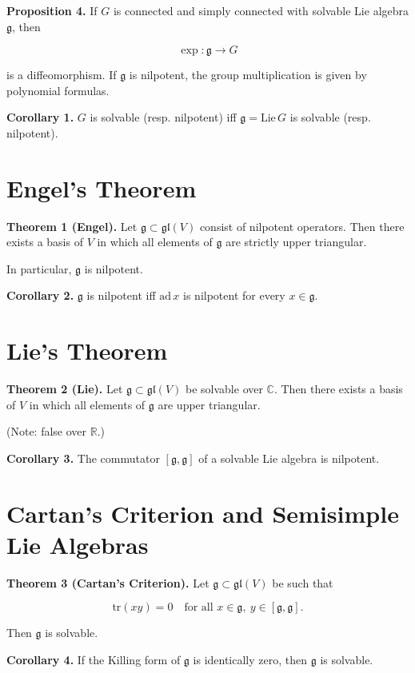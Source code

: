 \textbf{Proposition 4.}
If $G$ is connected and simply connected with solvable Lie algebra
$\mathfrak g$, then

\[
\exp:\mathfrak g\to G
\]

is a diffeomorphism.
If $\mathfrak g$ is nilpotent, the group multiplication
is given by polynomial formulas.

\textbf{Corollary 1.}
$G$ is solvable (resp. nilpotent)
iff $\mathfrak g=\mathrm{Lie}\,G$ is solvable (resp. nilpotent).

\section*{Engel's Theorem}

\textbf{Theorem 1 (Engel).}
Let $\mathfrak g\subset\mathfrak{gl}(V)$ consist of nilpotent operators.
Then there exists a basis of $V$ in which all elements of $\mathfrak g$
are strictly upper triangular.

In particular, $\mathfrak g$ is nilpotent.

\textbf{Corollary 2.}
$\mathfrak g$ is nilpotent iff $\mathrm{ad}\,x$ is nilpotent
for every $x\in\mathfrak g$.

\section*{Lie's Theorem}

\textbf{Theorem 2 (Lie).}
Let $\mathfrak g\subset\mathfrak{gl}(V)$ be solvable over $\mathbb C$.
Then there exists a basis of $V$ in which all elements
of $\mathfrak g$ are upper triangular.

(Note: false over $\mathbb R$.)

\textbf{Corollary 3.}
The commutator $[\mathfrak g,\mathfrak g]$
of a solvable Lie algebra is nilpotent.

\section*{Cartan's Criterion and Semisimple Lie Algebras}

\textbf{Theorem 3 (Cartan's Criterion).}
Let $\mathfrak g\subset\mathfrak{gl}(V)$ be such that

\[
\mathrm{tr}(xy)=0
\quad\text{for all } x\in\mathfrak g,\ y\in[\mathfrak g,\mathfrak g].
\]

Then $\mathfrak g$ is solvable.

\textbf{Corollary 4.}
If the Killing form of $\mathfrak g$ is identically zero,
then $\mathfrak g$ is solvable.

